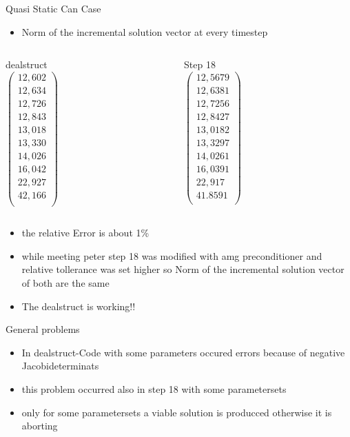 \documentclass[11pt]{beamer}
\begin{document}
\begin{frame}{Quasi Static Can Case}
\begin{itemize}
\item Norm of the incremental solution vector at every timestep
\end{itemize}
\begin{columns}
\begin{column}{0.4\textwidth}
dealstruct \\
  $\begin{pmatrix}
  12,602\\
  12,634\\
  12,726\\
  12,843\\
  13,018\\
  13,330\\
  14,026\\
  16,042\\
  22,927\\
  42,166\\
  \end{pmatrix}$
\end{column}
\begin{column}{0.4\textwidth}
Step 18\\
$\begin{pmatrix}
12,5679\\
12,6381\\
12,7256\\
12,8427\\
13,0182\\
13,3297\\
14,0261\\
16,0391\\
22,917\\
41.8591\\
\end{pmatrix}$
\end{column}
\end{columns}
\begin{itemize}
\item the relative Error is about 1\% 
\item while meeting peter step 18 was modified with amg preconditioner and relative tollerance was set higher so Norm of the incremental solution vector of both are the same
\item The dealstruct is working!!
\end{itemize}
\end{frame}

\begin{frame}{General problems}
\begin{itemize}
\item In dealstruct-Code with some parameters occured errors because of negative Jacobideterminats
\item this problem occurred also in step 18 with some parametersets
\item only for some parametersets a viable solution is producced otherwise it is aborting
\end{itemize}
\end{frame}
\end{document}
